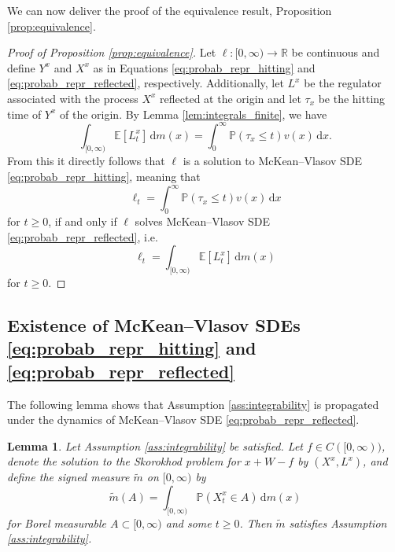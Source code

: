 \documentclass[11pt, a4paper]{article}
\theoremstyle{plain}
\newtheorem{lemma}[theorem]{Lemma}
\theoremstyle{definition}
\theoremstyle{remark}
\numberwithin{equation}{section}
\newcommand{\ev}{\mathbb{E}}
\newcommand{\pr}{\mathbb{P}}
\newcommand{\R}{\mathbb{R}}
\renewcommand{\d}{\mathrm{d}}
\newcommand{\define}{\mathpunct{:}}
\begin{document}
We can now deliver the proof of the equivalence result, Proposition \ref{prop:equivalence}.

\begin{proof}[Proof of Proposition \ref{prop:equivalence}]
Let $\ell \define [0, \infty) \to \R$ be continuous and define $Y^x$ and $X^x$ as in Equations \eqref{eq:probab_repr_hitting} and \eqref{eq:probab_repr_reflected}, respectively. Additionally, let $L^x$ be the regulator associated with the process $X^x$ reflected at the origin and let $\tau_x$ be the hitting time of $Y^x$ of the origin. By Lemma \ref{lem:integrals_finite}, we have
\begin{equation*}
    \int_{[0, \infty)} \ev[L^x_t]  \, \d m(x) = \int_0^{\infty} \pr(\tau_x \leq t) v(x) \, \d x.
\end{equation*}
From this it directly follows that $\ell$ is a solution to McKean--Vlasov SDE \eqref{eq:probab_repr_hitting}, meaning that 
\begin{equation*}
    \ell_t = \int_0^{\infty} \pr(\tau_x \leq t) v(x) \, \d x
\end{equation*}
for $t \geq 0$, if and only if $\ell$ solves McKean--Vlasov SDE \eqref{eq:probab_repr_reflected}, i.e.\@
\begin{equation*}
    \ell_t = \int_{[0, \infty)} \ev[L^x_t]  \, \d m(x)
\end{equation*}
for $t \geq 0$.
\end{proof}


\subsection{Existence of McKean--Vlasov SDEs \texorpdfstring{\eqref{eq:probab_repr_hitting}}{(EQ)} and \texorpdfstring{\eqref{eq:probab_repr_reflected}}{(EQ)}}

The following lemma shows that Assumption \ref{ass:integrability} is propagated under the dynamics of McKean--Vlasov SDE \eqref{eq:probab_repr_reflected}.

\begin{lemma} \label{lem:ass_propagation}
Let Assumption \ref{ass:integrability} be satisfied. Let $f \in C([0, \infty))$, denote the solution to the Skorokhod problem for $x + W - f$ by $(X^x, L^x)$, and define the signed measure $\tilde{m}$ on $[0, \infty)$ by
\begin{equation*}
    \tilde{m}(A) = \int_{[0, \infty)} \pr(X^x_t \in A) \, \d m(x)
\end{equation*}
for Borel measurable $A \subset [0, \infty)$ and some $t \geq 0$. Then $\tilde{m}$ satisfies Assumption \ref{ass:integrability}.
\end{lemma}
\end{document}

